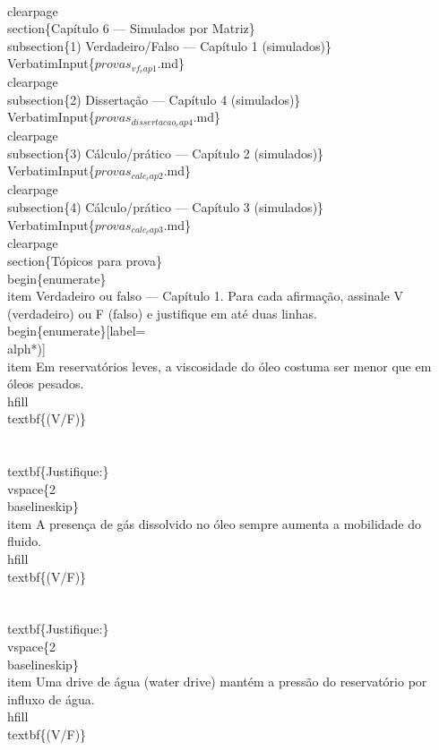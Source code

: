 \documentclass[11pt,a4paper]{article}
\begin{document}
\begin{enumerate}
{\\clearpage
\\section\{Capítulo 6 — Simulados por Matriz\}
\\subsection\{1) Verdadeiro/Falso — Capítulo 1 (simulados)\}
\\VerbatimInput\{$provas_{vf_cap1}$.md\}
\\clearpage
\\subsection\{2) Dissertação — Capítulo 4 (simulados)\}
\\VerbatimInput\{$provas_{dissertacao_cap4}$.md\}
\\clearpage
\\subsection\{3) Cálculo/prático — Capítulo 2 (simulados)\}
\\VerbatimInput\{$provas_{calc_cap2}$.md\}
\\clearpage
\\subsection\{4) Cálculo/prático — Capítulo 3 (simulados)\}
\\VerbatimInput\{$provas_{calc_cap3}$.md\}
\\clearpage
\\section\{Tópicos para prova\}
\\begin\{enumerate\}
\\item Verdadeiro ou falso — Capítulo 1. Para cada afirmação, assinale V (verdadeiro) ou F (falso) e justifique em até duas linhas.
\\begin\{enumerate\}[label=\\alph*)]
\\item Em reservatórios leves, a viscosidade do óleo costuma ser menor que em óleos pesados. \\hfill \\textbf\{(V/F)\}\\\\
\\textbf\{Justifique:\} \\vspace\{2\\baselineskip\}
\\item A presença de gás dissolvido no óleo sempre aumenta a mobilidade do fluido. \\hfill \\textbf\{(V/F)\}\\\\
\\textbf\{Justifique:\} \\vspace\{2\\baselineskip\}
\\item Uma drive de água (water drive) mantém a pressão do reservatório por influxo de água. \\hfill \\textbf\{(V/F)\}\\\\
}
\end{enumerate}
\end{document}
